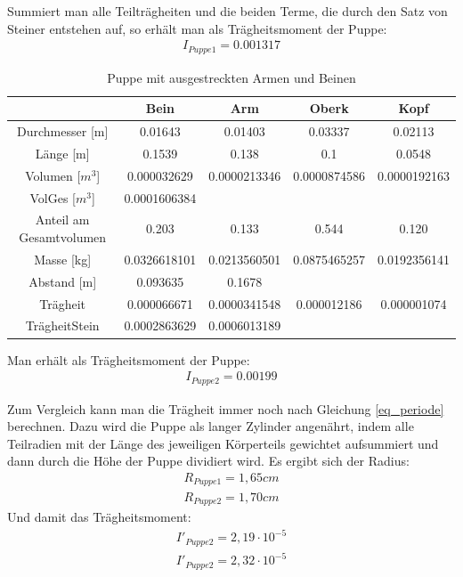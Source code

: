 Summiert man alle Teilträgheiten und die beiden Terme, die durch den Satz von Steiner entstehen auf, so erhält man als Trägheitsmoment der Puppe:
\begin{align*}
I_{Puppe 1}= 0.001317
\end{align*}

\begin{table}[htbp]
\begin{tabular}{|c|c|c|c|c|}
\hline 		
&	Bein&	Arm	&Oberk	&Kopf	\\ \hline	
Durchmesser [m]	&0.01643&	0.01403	&0.03337	&0.02113	\\ \hline		
Länge [m]	&0.1539	&0.138	&0.1	&0.0548\\ \hline	
Volumen [$m^3$]	&0.000032629	&0.0000213346	&0.0000874586	&0.0000192163\\ \hline	
VolGes [$m^3$]	&0.0001606384	&&&		\\ \hline	
Anteil am Gesamtvolumen&	0.203	&0.133&	0.544	&0.120\\ \hline
Masse [kg]	&0.0326618101&	0.0213560501	&0.0875465257	&0.0192356141\\ \hline	
Abstand [m]&	0.093635	&0.1678&&\\ \hline	
Trägheit&	0.000066671&	0.0000341548&	0.000012186&	0.000001074\\ \hline	
TrägheitStein&	0.0002863629&	0.0006013189&&	\\ \hline	
\end{tabular} 
\caption{Puppe mit ausgestreckten Armen und Beinen}
\end{table}

Man erhält als Trägheitsmoment der Puppe:
\begin{align*}
I_{Puppe 2}=0.00199
\end{align*}

Zum Vergleich kann man die Trägheit immer noch nach Gleichung \eqref{eq_periode} berechnen. Dazu wird die Puppe als langer Zylinder angenährt, indem alle Teilradien mit der Länge des jeweiligen Körperteils gewichtet aufsummiert und dann durch die Höhe der Puppe dividiert wird. Es ergibt sich der Radius:
\begin{align*}
R_{Puppe 1}=1,65cm\\
R_{Puppe 2}=1,70cm
\end{align*}
Und damit das Trägheitsmoment:
\begin{align*}
I'_{Puppe 2}=2,19\cdot10^{-5}\\
I'_{Puppe 2}=2,32\cdot10^{-5}
\end{align*}

